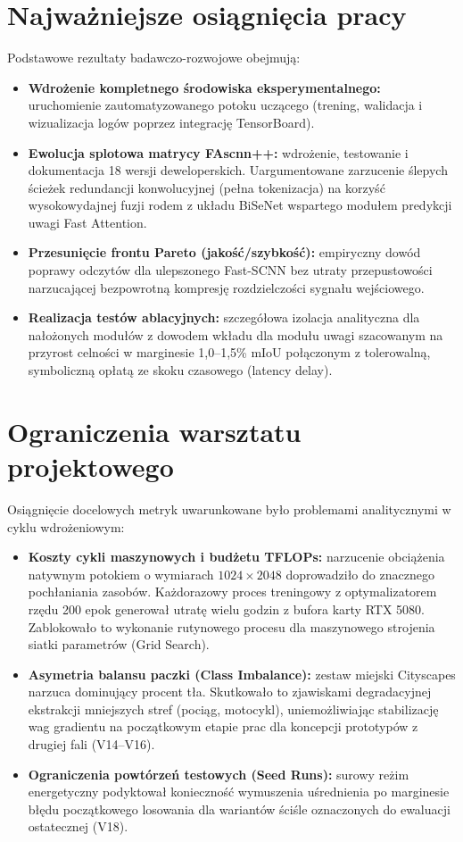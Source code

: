 \section{Najważniejsze osiągnięcia pracy}
Podstawowe rezultaty badawczo-rozwojowe obejmują:
\begin{itemize}
    \item \textbf{Wdrożenie kompletnego środowiska eksperymentalnego:} uruchomienie zautomatyzowanego potoku uczącego (trening, walidacja i wizualizacja logów poprzez integrację TensorBoard).
    \item \textbf{Ewolucja splotowa matrycy FAscnn++:} wdrożenie, testowanie i dokumentacja 18 wersji deweloperskich. Uargumentowane zarzucenie ślepych ścieżek redundancji konwolucyjnej (pełna tokenizacja) na korzyść wysokowydajnej fuzji rodem z układu BiSeNet wspartego modułem predykcji uwagi Fast Attention.
    \item \textbf{Przesunięcie frontu Pareto (jakość/szybkość):} empiryczny dowód poprawy odczytów dla ulepszonego Fast-SCNN bez utraty przepustowości narzucającej bezpowrotną kompresję rozdzielczości sygnału wejściowego.
    \item \textbf{Realizacja testów ablacyjnych:} szczegółowa izolacja analityczna dla nałożonych modułów z dowodem wkładu dla modułu uwagi szacowanym na przyrost celności w marginesie 1,0--1,5\% mIoU połączonym z tolerowalną, symboliczną opłatą ze skoku czasowego (latency delay).
\end{itemize}

\section{Ograniczenia warsztatu projektowego}
Osiągnięcie docelowych metryk uwarunkowane było problemami analitycznymi w cyklu wdrożeniowym:
\begin{itemize}
    \item \textbf{Koszty cykli maszynowych i budżetu TFLOPs:} narzucenie obciążenia natywnym potokiem o wymiarach $1024 \times 2048$ doprowadziło do znacznego pochłaniania zasobów. Każdorazowy proces treningowy z optymalizatorem rzędu 200 epok generował utratę wielu godzin z bufora karty RTX 5080. Zablokowało to wykonanie rutynowego procesu dla maszynowego strojenia siatki parametrów (Grid Search).
    \item \textbf{Asymetria balansu paczki (Class Imbalance):} zestaw miejski Cityscapes narzuca dominujący procent tła. Skutkowało to zjawiskami degradacyjnej ekstrakcji mniejszych stref (pociąg, motocykl), uniemożliwiając stabilizację wag gradientu na początkowym etapie prac dla koncepcji prototypów z drugiej fali (V14--V16).
    \item \textbf{Ograniczenia powtórzeń testowych (Seed Runs):} surowy reżim energetyczny podyktował konieczność wymuszenia uśrednienia po marginesie błędu początkowego losowania dla wariantów ściśle oznaczonych do ewaluacji ostatecznej (V18).
\end{itemize}


